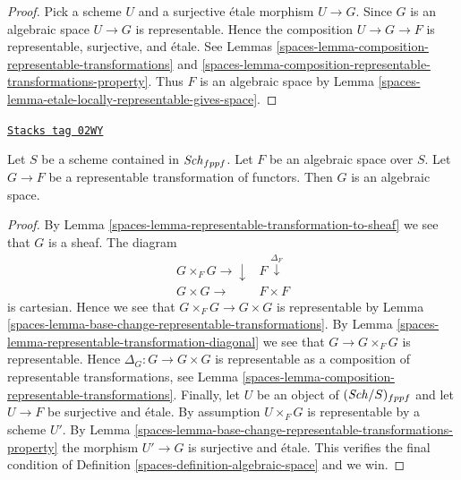 \begin{proof}

Pick a scheme $U$ and a surjective \'etale morphism $U \to G$.
Since $G$ is an algebraic space $U \to G$ is representable.
Hence the composition $U \to G \to F$ is representable,
surjective, and \'etale. See Lemmas
\ref{spaces-lemma-composition-representable-transformations} and
\ref{spaces-lemma-composition-representable-transformations-property}.
Thus $F$ is an algebraic space by
Lemma \ref{spaces-lemma-etale-locally-representable-gives-space}.
\end{proof}

\begin{lemma}
\label{spaces-lemma-representable-over-space}
\href{https://stacks.math.columbia.edu/tag/02WY}{\texttt{Stacks tag 02WY}}


Let $S$ be a scheme contained in $\mathit{Sch}_{fppf}$.
Let $F$ be an algebraic space over $S$.
Let $G \to F$ be a representable transformation of functors.
Then $G$ is an algebraic space.
\end{lemma}

\begin{proof}

By Lemma \ref{spaces-lemma-representable-transformation-to-sheaf}
we see that $G$ is a sheaf. The diagram
$$
\begin{array}{cc}G \times_F G \longrightarrow\downarrow & F \overset{\Delta_F}{\downarrow} \\ G \times G \longrightarrow & F \times F\end{array}
$$
is cartesian. Hence we see that $G \times_F G \to G \times G$
is representable by
Lemma \ref{spaces-lemma-base-change-representable-transformations}.
By
Lemma \ref{spaces-lemma-representable-transformation-diagonal}
we see that $G \to G \times_F G$ is representable.
Hence $\Delta_G : G \to G \times G$ is representable as a composition
of representable transformations, see
Lemma \ref{spaces-lemma-composition-representable-transformations}.
Finally, let $U$ be an object of $(\mathit{Sch}/S)_{fppf}$
and let $U \to F$ be surjective and \'etale. By assumption
$U \times_F G$ is representable by a scheme $U'$. By
Lemma \ref{spaces-lemma-base-change-representable-transformations-property}
the morphism $U' \to G$ is surjective and \'etale. This verifies
the final condition of Definition \ref{spaces-definition-algebraic-space} and we win.
\end{proof}

